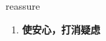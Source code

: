 
\begin{frame}
{\huge reassure}
\begin{center}
\begin{enumerate}\Large
  \item \textbf{使安心，打消疑虑}
\end{enumerate}
\end{center}
\end{frame}
